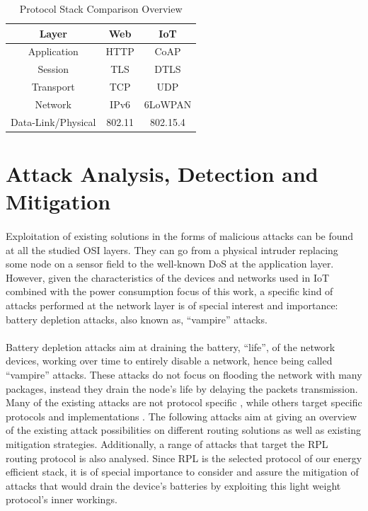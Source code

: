 \begin{table}[h]
	\centering
	\begin{center} \caption{Protocol Stack Comparison Overview } \label{tab:stack}\end{center}
	\begin{tabular}{c|c|c}
		Layer & Web & IoT \\
		\hline
		Application & \gls{HTTP} & \gls{CoAP} \\
		Session & \gls{TLS} & \gls{DTLS} \\
		Transport & \gls{TCP} & \gls{UDP} \\
		Network & IPv6 & 6LoWPAN \\
		Data-Link/Physical & 802.11 & 802.15.4
	\end{tabular}
\end{table}

\section{Attack Analysis, Detection and Mitigation}
\label{sec:attack_analysis}
\paragraph{}
Exploitation of existing solutions in the forms of malicious attacks can be found at all the studied OSI layers. They can go from a physical intruder replacing some node on a sensor field to the well-known \gls{DoS} at the application layer. However, given the characteristics of the devices and networks used in \gls{IoT} combined with the power consumption focus of this work, a specific kind of attacks performed at the network layer is of special interest and importance: battery depletion attacks, also known as, ``vampire'' attacks.

\paragraph{}
Battery depletion attacks aim at draining the battery, ``life'', of the network devices, working over time to entirely disable a network, hence being called ``vampire'' attacks. These attacks do not focus on flooding the network with many packages, instead they drain the node's life by delaying the packets transmission. Many of the existing attacks are not protocol specific \cite{Vasserman2013}, while others target specific protocols and implementations \cite{Pongle2015}. The following attacks aim at giving an overview of the existing attack possibilities on different routing solutions as well as existing mitigation strategies. Additionally, a range of attacks that target the RPL routing protocol is also analysed. Since RPL is the selected protocol of our energy efficient stack, it is of special importance to consider and assure the mitigation of attacks that would drain the device's batteries by exploiting this light weight protocol's inner workings.   

